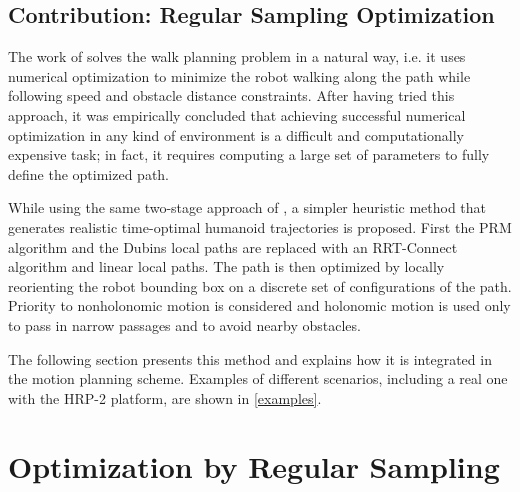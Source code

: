 \subsection{Contribution: Regular Sampling Optimization}
The work of \cite{moul10} solves the walk planning problem
in a natural way, i.e. it uses numerical optimization to minimize the
robot walking along the path while following speed and obstacle
distance constraints. After having tried this approach, it was
empirically concluded that achieving successful numerical optimization
in any kind of environment is a difficult and computationally
expensive task; in fact, it requires computing a large set of
parameters to fully define the optimized path.

While using the same two-stage approach of \cite{yosh08}, a simpler
heuristic method that generates realistic time-optimal humanoid
trajectories is proposed. First the PRM algorithm and the Dubins local
paths are replaced with an RRT-Connect algorithm and linear local
paths. The path is then optimized by locally reorienting the robot
bounding box on a discrete set of configurations of the path. Priority
to nonholonomic motion is considered and holonomic motion is used only
to pass in narrow passages and to avoid nearby obstacles.

The following section presents this method and explains how it is
integrated in the motion planning scheme. Examples of different
scenarios, including a real one with the HRP-2 platform, are shown in
\autoref{examples}.

\section{Optimization by Regular Sampling}
\label{sec:regular-sampling-optim}

